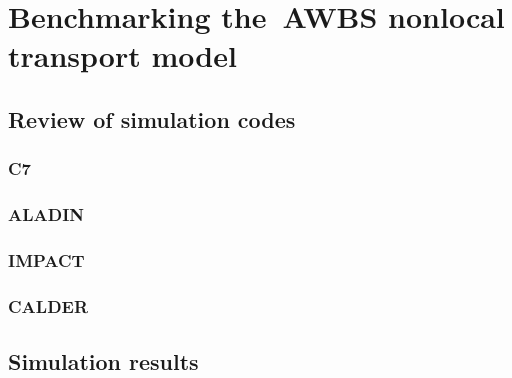 \documentclass[preprint,12pt]{elsarticle}
\begin{document}
\section{Benchmarking the~AWBS nonlocal transport model}
\label{sec:BenchmarkingAWBS}

\subsection{Review of simulation codes}
\label{sec:ReviewOfCodes}

\subsubsection{C7}
\label{sec:C7code}

\subsubsection{ALADIN}
\label{sec:ALADINcode}

\subsubsection{IMPACT}
\label{sec:IMPACTcode}

\subsubsection{CALDER}
\label{sec:CALDERcode}

\subsection{Simulation results}
\label{sec:SimulationResults}
\end{document}
